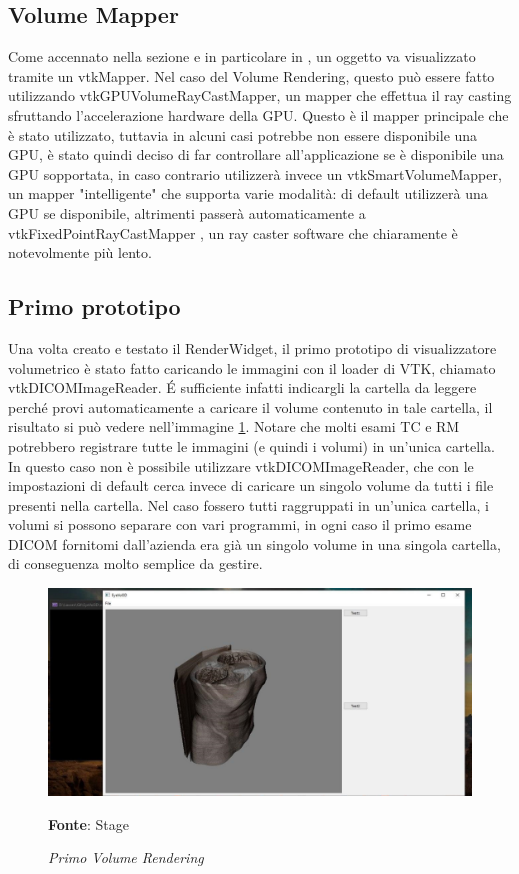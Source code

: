 \subsection{Volume Mapper}
Come accennato nella sezione  e in particolare in , un oggetto va visualizzato tramite un vtkMapper. Nel caso del Volume Rendering, questo può essere fatto utilizzando vtkGPUVolumeRayCastMapper, un mapper che effettua il ray casting sfruttando l'accelerazione hardware della GPU. Questo è il mapper principale che è stato utilizzato, tuttavia in alcuni casi potrebbe non essere disponibile una GPU, è stato quindi deciso di far controllare all'applicazione se è disponibile una GPU sopportata, in caso contrario utilizzerà invece un vtkSmartVolumeMapper, un mapper "intelligente" che supporta varie modalità: di default utilizzerà una GPU se disponibile, altrimenti passerà automaticamente a vtkFixedPointRayCastMapper , un ray caster software che chiaramente è notevolmente più lento.

\subsection{Primo prototipo}
Una volta creato e testato il RenderWidget, il primo prototipo di visualizzatore volumetrico è stato fatto caricando le immagini con il loader di VTK, chiamato vtkDICOMImageReader. \'E sufficiente infatti indicargli la cartella da leggere perché provi automaticamente a caricare il volume contenuto in tale cartella, il risultato si può vedere nell'immagine \ref{fig: firstvolume}. Notare che molti esami TC e RM potrebbero registrare tutte le immagini (e quindi i volumi) in un'unica cartella. In questo caso non è possibile utilizzare vtkDICOMImageReader, che con le impostazioni di default cerca invece di caricare un singolo volume da tutti i file presenti nella cartella. Nel caso fossero tutti raggruppati in un'unica cartella, i volumi si possono separare con vari programmi, in ogni caso il primo esame DICOM fornitomi dall'azienda era già un singolo volume in una singola cartella, di conseguenza molto semplice da gestire.

\begin{figure}[h]
    \centering
    \includegraphics[width=1\textwidth]{immagini/svolgimento/firstvolume.jpg}
    \caption{\textit{Primo Volume Rendering}}
    \textbf{Fonte}: Stage
    \label{fig: firstvolume}
\end{figure}


